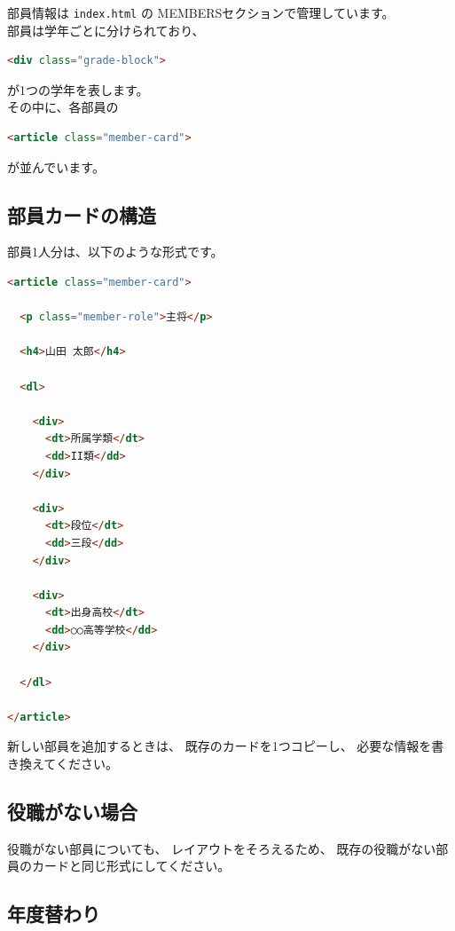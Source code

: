 \documentclass[a4paper,11pt]{ltjsarticle}
\begin{document}
部員情報は \texttt{index.html} の
MEMBERSセクションで管理しています。\\
部員は学年ごとに分けられており、

\begin{lstlisting}[language=HTML]
<div class="grade-block">
\end{lstlisting}

が1つの学年を表します。\\
その中に、各部員の

\begin{lstlisting}[language=HTML]
<article class="member-card">
\end{lstlisting}

が並んでいます。


\subsection{部員カードの構造}

部員1人分は、以下のような形式です。

\begin{lstlisting}[language=HTML]
<article class="member-card">

  <p class="member-role">主将</p>

  <h4>山田 太郎</h4>

  <dl>

    <div>
      <dt>所属学類</dt>
      <dd>II類</dd>
    </div>

    <div>
      <dt>段位</dt>
      <dd>三段</dd>
    </div>

    <div>
      <dt>出身高校</dt>
      <dd>○○高等学校</dd>
    </div>

  </dl>

</article>
\end{lstlisting}

新しい部員を追加するときは、
既存のカードを1つコピーし、
必要な情報を書き換えてください。


\subsection{役職がない場合}

役職がない部員についても、
レイアウトをそろえるため、
既存の役職がない部員のカードと同じ形式にしてください。


\subsection{年度替わり}
\end{document}
